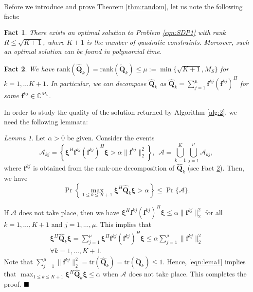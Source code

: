\documentclass[twocolumn,10pt]{IEEEtran}
\theoremstyle{plain} \newtheorem{theorem}{Theorem}
\theoremstyle{plain} \newtheorem{proposition}{Proposition}
\theoremstyle{plain} \newtheorem{corollary}{Corollary}
\theoremstyle{remark} \newtheorem{remark}{Remark}
\theoremstyle{remark} \newtheorem{lemma}{Lemma}
\theoremstyle{plain} \newtheorem{definition}{Definition}
\theoremstyle{plain} \newtheorem{assumption}{Assumption}
\theoremstyle{plain} \newtheorem{fact}{Fact}
\begin{document}
Before we introduce and prove Theorem \ref{thm:random}, let us note the following facts:
\begin{fact}\label{fact:rank}
\cite{HZ07} There exists an optimal solution to Problem \eqref{eqn:SDP1} with rank $R\leq\sqrt{K+1}$, where $K+1$ is the number of quadratic constraints. Moreover, such an optimal solution can be found in polynomial time.
\end{fact}

\begin{fact}\label{fact:Qk}
We have $\mathrm{rank}(\widehat{\mathbf{Q}}_k)=\mathrm{rank}(\tilde{\mathbf{Q}}_k)\leq \mu:=\min\{\sqrt{K+1}, M_S\}$ for $k=1,\ldots K+1$.  In particular, we can decompose $\widehat{\mathbf{Q}}_k$ as $\widehat{\mathbf{Q}}_k=\sum_{j=1}^\mu \mathbf{f}^{kj}(\mathbf{f}^{kj})^H$ for some $\mathbf{f}^{kj}\in\mathbb{C}^{M_S}$.
\end{fact}
In order to study the quality of the solution returned by Algorithm \ref{alg:2}, we need the following lemmata:
\begin{lemma}\label{lem:A}
Let $\alpha>0$ be given.  Consider the events
$$ \mathcal{A}_{kj} = \left\{\mathbf{\xi}^H\mathbf{f}^{kj}(\mathbf{f}^{kj})^H\mathbf{\xi}>\alpha\|\mathbf{f}^{kj}\|_2^2\right\},~~
\mathcal{A} = \bigcup_{k=1}^K\bigcup_{j=1}^\mu \mathcal{A}_{kj}, $$
where $\mathbf{f}^{kj}$ is obtained from the rank-one decomposition of $\widehat{\mathbf{Q}}_k$ (see Fact \ref{fact:Qk}). Then, we have
$$
\Pr\left\{\max_{1\le k\le K+1} \mathbf{\xi}^H\widehat{\mathbf{Q}}_k\mathbf{\xi}>\alpha\right\} \le \Pr\{\mathcal{A}\}.
$$
\end{lemma}
 If $\mathcal{A}$ does not take place, then we have $\mathbf{\xi}^H\mathbf{f}^{kj}(\mathbf{f}^{kj})^H\mathbf{\xi}\leq \alpha\|\mathbf{f}^{kj}\|_2^2$ for all $k=1,\ldots,K+1$ and $j=1,\ldots,\mu$.  This implies that
\begin{eqnarray}\label{eqn:lema1}
   \mathbf{\xi}^H\widehat{\mathbf{Q}}_k\mathbf{\xi} = \sum_{j=1}^\mu \mathbf{\xi}^H\mathbf{f}^{kj}(\mathbf{f}^{kj})^H\mathbf{\xi}\leq \alpha\sum_{j=1}^\mu\|\mathbf{f}^{kj}\|_2^2\nonumber\\
   \forall k=1,\ldots,K+1.
\end{eqnarray}
Note that $\sum_{j=1}^\mu\|\mathbf{f}^{kj}\|_2^2=\mathrm{tr}(\widehat{\mathbf{Q}}_k)=\mathrm{tr}(\tilde{\mathbf{Q}}_k)\leq1$.  Hence, \eqref{eqn:lema1} implies that $\max_{1\le k\le K+1} \mathbf{\xi}^H\widehat{\mathbf{Q}}_k\mathbf{\xi}\leq \alpha$ when $\mathcal{A}$ does not take place.  This completes the proof. $\hfill\blacksquare$
\end{document}
